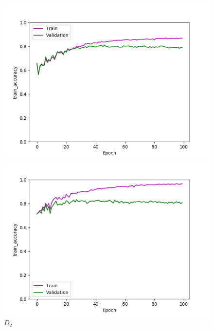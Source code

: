 \def\year{2017}\relax \documentclass[letterpaper]{article}
\begin{document}
\begin{figure}
\centering
\begin{minipage}{.24\textwidth}
  \centering
\includegraphics[width=\textwidth]{pics/d1_train_accuracy_best_train_test.png}
\caption{$D_1$}\label{fig:d1acctraintest}
\end{minipage}
\begin{minipage}{.01\textwidth}
\end{minipage}
\begin{minipage}{.24\textwidth}
  \centering
\includegraphics[width=\textwidth]{pics/d2_train_accuracy_best_train_test.png}
\caption{$D_2$}\label{fig:d2acctraintest}
\end{minipage}
\begin{minipage}{.24\textwidth}

\end{minipage}
\end{figure}
\end{document}
